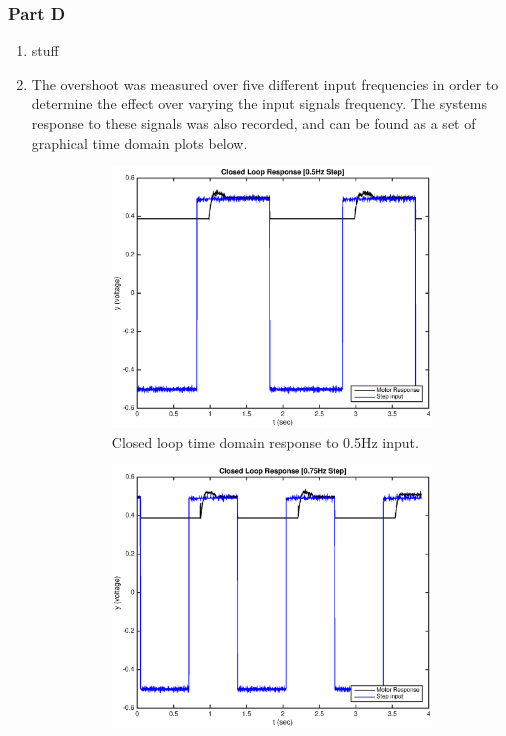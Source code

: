 \documentclass[11pt,a4paper]{article}
\begin{document}
\pagebreak
\subsubsection{Part D}
\label{sec:d}
\begin{enumerate}
	\item stuff
	
	
	
	
	
	\item The overshoot was measured over five different input frequencies in order to determine the effect over varying the input signals frequency. The systems response to these signals was also recorded, and can be found as a set of graphical time domain plots below.
	\begin{figure}[H]
	  \begin{subfigure}{0.5\textwidth}
	  \includegraphics[width=0.9\linewidth]{Matlab_Code/Figures/D2_0_5Hz.eps} 
	  \caption{Closed loop time domain response to 0.5Hz input.}
	  \label{fig:subim1}
	  \end{subfigure}
	  \begin{subfigure}{0.5\textwidth}
	  \includegraphics[width=0.9\linewidth]{Matlab_Code/Figures/D2_0_75Hz.eps}

\end{subfigure}
\end{figure}
\end{enumerate}
\end{document}
